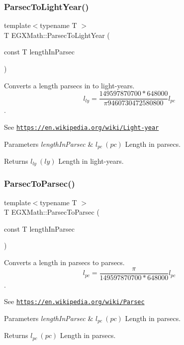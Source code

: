 \subsubsection{\texorpdfstring{Parsec\+To\+Light\+Year()}{ParsecToLightYear()}}
{\footnotesize\ttfamily template$<$typename T $>$ \\
T E\+G\+X\+Math\+::\+Parsec\+To\+Light\+Year (\begin{DoxyParamCaption}\item[{const T}]{length\+In\+Parsec }\end{DoxyParamCaption})}



Converts a length parsecs in to light-\/years. \[ l_{ly}= \frac{149597870700 * 648000}{\pi 9460730472580800} l_{pc} \]. 

See \href{https://en.wikipedia.org/wiki/Light-year}{\tt https\+://en.\+wikipedia.\+org/wiki/\+Light-\/year} 
\begin{DoxyParams}{Parameters}
{\em length\+In\+Parsec} & $ l_{pc}\ (pc)$ Length in parsecs. \\
\hline
\end{DoxyParams}
\begin{DoxyReturn}{Returns}
$ l_{ly}\ (ly)$ Length in light-\/years. 
\end{DoxyReturn}
\mbox{\label{group___e_g_x_math-_conversions-_length_conversions-_astronomical-_parsec-_astronomical_gaf26b93b0097631545621d26c5a1366fc}} 
\subsubsection{\texorpdfstring{Parsec\+To\+Parsec()}{ParsecToParsec()}}
{\footnotesize\ttfamily template$<$typename T $>$ \\
T E\+G\+X\+Math\+::\+Parsec\+To\+Parsec (\begin{DoxyParamCaption}\item[{const T}]{length\+In\+Parsec }\end{DoxyParamCaption})}



Converts a length in parsecs to parsecs. \[ l_{pc}=\frac{\pi}{149597870700 * 648000} l_{pc} \]. 

See \href{https://en.wikipedia.org/wiki/Parsec}{\tt https\+://en.\+wikipedia.\+org/wiki/\+Parsec} 
\begin{DoxyParams}{Parameters}
{\em length\+In\+Parsec} & $ l_{pc}\ (pc)$ Length in parsecs. \\
\hline
\end{DoxyParams}
\begin{DoxyReturn}{Returns}
$ l_{pc}\ (pc)$ Length in parsecs. 
\end{DoxyReturn}
